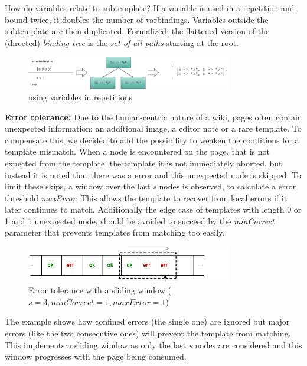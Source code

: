 How do variables relate to subtemplate? If a variable is used in a repetition and bound twice, it doubles the number of varbindings. 
Variables outside the subtemplate are then duplicated. Formalized: the flattened version of the (directed) \textit{binding tree} is the \textit{set of all paths} starting at the root.
\begin{figure}[htbp]
\centering
\includegraphics[width=0.8\textwidth]{../images/varlist}
\caption{using variables in repetitions}
\label{fig:varlist}
\end{figure}\newline
\textbf{Error tolerance:}
Due to the human-centric nature of a wiki, pages often contain unexpected information: an additional image, a editor note or a rare template. 
To compensate this, we decided to add the possibility to weaken the conditions for a template mismatch. 
When a node is encountered on the page, that is not expected from the template, the template it is not immediately aborted, but instead it is noted that there was a error and this unexpected node is skipped. 
To limit these skips, a window over the last \textit{s} nodes is observed, to calculate a error threshold \textit{maxError}. 
This allows the template to recover from local errors if it later continues to match. 
Additionally the edge case of templates with length 0 or 1 and 1 unexpected node, should be avoided to succeed by the \textit{minCorrect} parameter that prevents templates from matching too easily.
\begin{figure}[h]
\centering
\includegraphics[width=0.8\textwidth]{../images/sliding}
\caption{Error tolerance with a sliding window ($\textit{s}=3, \textit{minCorrect}=1, \textit{maxError}=1)$}
\label{fig:sliding}
\end{figure}
The example shows how confined errors (the single one) are ignored but major errors (like the two consecutive ones) will prevent the template from matching.
This implements a sliding window as only the last \textit{s} nodes are considered and this window progresses with the page being consumed.\newline
